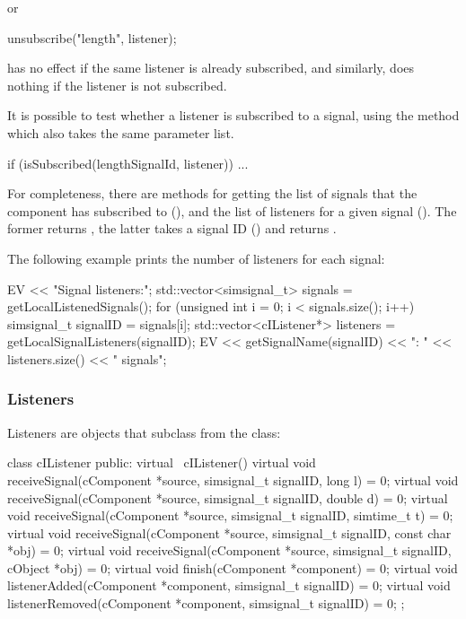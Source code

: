\begin{note}
\begin{note}
or

\begin{cpp}
unsubscribe("length", listener);
\end{cpp}

 has no effect if the same listener is already
subscribed, and similarly,  does nothing
if the listener is not subscribed.

It is possible to test whether a listener is subscribed to a signal,
using the  method which also takes the same
parameter list.

\begin{cpp}
if (isSubscribed(lengthSignalId, listener))
{
    ...
}
\end{cpp}

For completeness, there are methods for getting the list of signals
that the component has subscribed to (),
and the list of listeners for a given signal ().
The former returns , the latter takes
a signal ID () and returns .

The following example prints the number of listeners for each signal:

\begin{cpp}
EV << "Signal listeners:\n";
std::vector<simsignal_t> signals = getLocalListenedSignals();
for (unsigned int i = 0; i < signals.size(); i++) {
    simsignal_t signalID = signals[i];
    std::vector<cIListener*> listeners = getLocalSignalListeners(signalID);
    EV << getSignalName(signalID) << ": " << listeners.size() << " signals\n";
}
\end{cpp}

\subsubsection{Listeners}

Listeners are objects that subclass from the  class:

\begin{cpp}
class cIListener
{
  public:
    virtual ~cIListener() {}
    virtual void receiveSignal(cComponent *source, simsignal_t signalID, long l) = 0;
    virtual void receiveSignal(cComponent *source, simsignal_t signalID, double d) = 0;
    virtual void receiveSignal(cComponent *source, simsignal_t signalID, simtime_t t) = 0;
    virtual void receiveSignal(cComponent *source, simsignal_t signalID, const char *obj) = 0;
    virtual void receiveSignal(cComponent *source, simsignal_t signalID, cObject *obj) = 0;
    virtual void finish(cComponent *component) = 0;
    virtual void listenerAdded(cComponent *component, simsignal_t signalID) = 0;
    virtual void listenerRemoved(cComponent *component, simsignal_t signalID) = 0;
};
\end{cpp}


\end{note}
\end{note}
